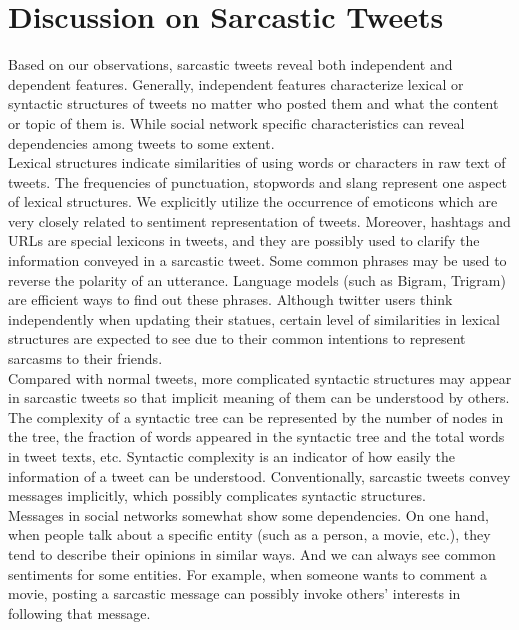 \section{Discussion on Sarcastic Tweets}
\label{sec:dataset}

Based on our observations, sarcastic tweets reveal both independent and dependent features. Generally, independent features characterize lexical or syntactic structures of tweets no matter who posted them and what the content or topic of them is. While social network specific characteristics can reveal dependencies among tweets to some extent.\\

Lexical structures indicate similarities of using words or characters in raw text of tweets. The frequencies of punctuation, stopwords and slang represent one aspect of lexical structures. We explicitly utilize the occurrence of emoticons which are very closely related to sentiment representation of tweets. Moreover, hashtags and URLs are special lexicons in tweets, and they are possibly used to clarify the information conveyed in a sarcastic tweet. Some common phrases may be used to reverse the polarity of an utterance. Language models (such as Bigram, Trigram) are efficient ways to find out these phrases. Although twitter users think independently when updating their statues, certain level of similarities in lexical structures are expected to see due to their common intentions to represent sarcasms to their friends.\\

Compared with normal tweets, more complicated syntactic structures may appear in sarcastic tweets so that implicit meaning of them can be understood by others. The complexity of a syntactic tree can be represented by the number of nodes in the tree, the fraction of words appeared in the syntactic tree and the total words in tweet texts, etc. Syntactic complexity is an indicator of how easily the information of a tweet can be understood. Conventionally, sarcastic tweets convey messages implicitly, which possibly complicates syntactic structures.\\

Messages in social networks somewhat show some dependencies. On one hand, when people talk about a specific entity (such as a person, a movie, etc.), they tend to describe their opinions in similar ways. And we can always see common sentiments for some entities. For example, when someone wants to comment a movie, posting a sarcastic message can possibly invoke others' interests in following that message.\\

